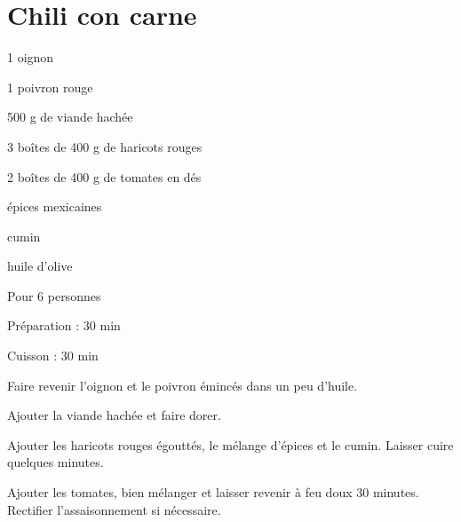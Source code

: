 \section[\normalsize{Chili con carne}]{Chili con carne}

\begin{ingredients}
\item 1 oignon
\item 1 poivron rouge
\item 500 g de viande hach\'ee
\item 3 bo\^ites de 400 g de haricots rouges
\item 2 bo\^ites de 400 g de tomates en d\'es
\item \'epices mexicaines
\item cumin
\item huile d'olive
\end{ingredients}
\begin{infos}
\item Pour 6 personnes
\item Préparation : 30 min
\item Cuisson : 30 min
\end{infos}
\begin{etapes}
\item Faire revenir l'oignon et le poivron \'eminc\'es dans un peu d'huile. 
\item Ajouter la viande hach\'ee et faire dorer.
\item Ajouter les haricots rouges \'egoutt\'es, le m\'elange d'\'epices et le cumin. Laisser cuire quelques minutes.
\item Ajouter les tomates, bien m\'elanger et laisser revenir \`a feu doux 30 minutes. Rectifier l'assaisonnement si n\'ecessaire.
\end{etapes}
\begin{conseils}
\end{conseils}

